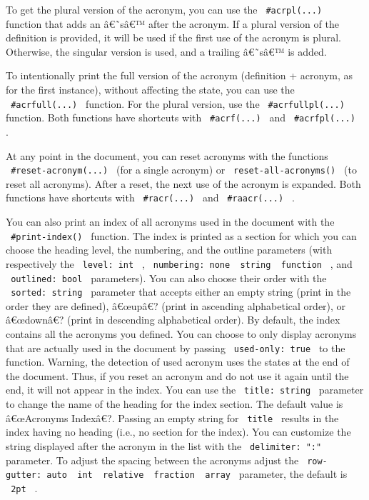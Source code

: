 To get the plural version of the acronym, you can use the
\texttt{\ \#acrpl(...)\ } function that adds an â€˜sâ€™ after the
acronym. If a plural version of the definition is provided, it will be
used if the first use of the acronym is plural. Otherwise, the singular
version is used, and a trailing â€˜sâ€™ is added.

To intentionally print the full version of the acronym (definition +
acronym, as for the first instance), without affecting the state, you
can use the \texttt{\ \#acrfull(...)\ } function. For the plural
version, use the \texttt{\ \#acrfullpl(...)\ } function. Both functions
have shortcuts with \texttt{\ \#acrf(...)\ } and
\texttt{\ \#acrfpl(...)\ } .

At any point in the document, you can reset acronyms with the functions
\texttt{\ \#reset-acronym(...)\ } (for a single acronym) or
\texttt{\ reset-all-acronyms()\ } (to reset all acronyms). After a
reset, the next use of the acronym is expanded. Both functions have
shortcuts with \texttt{\ \#racr(...)\ } and \texttt{\ \#raacr(...)\ } .

You can also print an index of all acronyms used in the document with
the \texttt{\ \#print-index()\ } function. The index is printed as a
section for which you can choose the heading level, the numbering, and
the outline parameters (with respectively the \texttt{\ level:\ int\ } ,
\texttt{\ numbering:\ none\ \textbar{}\ string\ \textbar{}\ function\ }
, and \texttt{\ outlined:\ bool\ } parameters). You can also choose
their order with the \texttt{\ sorted:\ string\ } parameter that accepts
either an empty string (print in the order they are defined), â€œupâ€?
(print in ascending alphabetical order), or â€œdownâ€? (print in
descending alphabetical order). By default, the index contains all the
acronyms you defined. You can choose to only display acronyms that are
actually used in the document by passing \texttt{\ used-only:\ true\ }
to the function. Warning, the detection of used acronym uses the states
at the end of the document. Thus, if you reset an acronym and do not use
it again until the end, it will not appear in the index. You can use the
\texttt{\ title:\ string\ } parameter to change the name of the heading
for the index section. The default value is â€œAcronyms Indexâ€?.
Passing an empty string for \texttt{\ title\ } results in the index
having no heading (i.e., no section for the index). You can customize
the string displayed after the acronym in the list with the
\texttt{\ delimiter:\ ":"\ } parameter. To adjust the spacing between
the acronyms adjust the
\texttt{\ row-gutter:\ auto\ \textbar{}\ int\ \textbar{}\ relative\ \textbar{}\ fraction\ \textbar{}\ array\ }
parameter, the default is \texttt{\ 2pt\ } .

